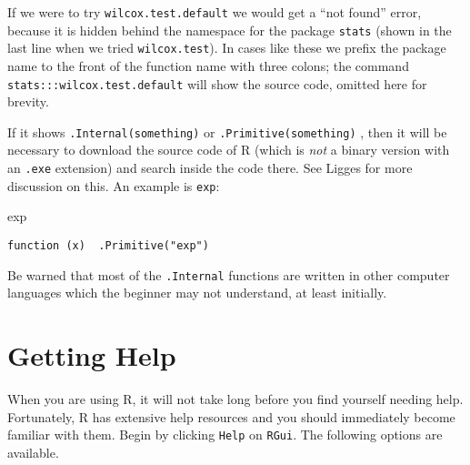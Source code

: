\documentclass[]{book}
\newenvironment{Shaded}{\begin{snugshade}}{\end{snugshade}}
\newcommand{\NormalTok}[1]{{#1}}
\numberwithin{equation}{chapter}
\numberwithin{figure}{chapter}
\theoremstyle{plain}
\theoremstyle{definition}
\theoremstyle{remark}
\theoremstyle{definition}
\theoremstyle{definition}
\theoremstyle{remark}
\begin{document}
If we were to try \texttt{wilcox.test.default} we would get a ``not
found'' error, because it is hidden behind the namespace for the package
\texttt{stats} \autocite{stats} (shown in the last line when we tried
\texttt{wilcox.test}). In cases like these we prefix the package name to
the front of the function name with three colons; the command
\texttt{stats:::wilcox.test.default} will show the source code, omitted
here for brevity.

If it shows \texttt{.Internal(something)}
 or \texttt{.Primitive(something)}
, then it will be necessary to
download the source code of R (which is \emph{not} a binary version with
an \texttt{.exe} extension) and search inside the code there. See Ligges
\autocite{Ligges2006} for more discussion on this. An example is
\texttt{exp}:

\begin{Shaded}
\begin{Highlighting}[]
\NormalTok{exp}
\end{Highlighting}
\end{Shaded}

\begin{verbatim}
function (x)  .Primitive("exp")
\end{verbatim}

Be warned that most of the \texttt{.Internal} functions are written in
other computer languages which the beginner may not understand, at least
initially.

\section{Getting Help}\label{sec-getting-help}

When you are using R, it will not take long before you find yourself
needing help. Fortunately, R has extensive help resources and you should
immediately become familiar with them. Begin by clicking \texttt{Help}
on \texttt{RGui}. The following options are available.
\end{document}

